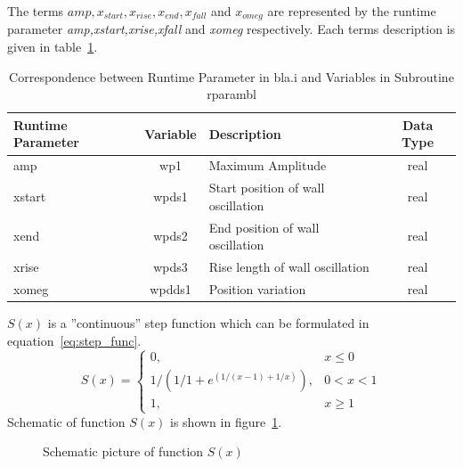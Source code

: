 The terms $amp,x_{start},x_{rise},x_{end},x_{fall}$ and $x_{omeg}$ are represented by the runtime parameter \emph{amp,xstart,xrise,xfall} and \emph{xomeg} respectively. Each terms description is given in table~\ref{tab:runtime}.
\begin{table}[h]
  \centering
  \begin{tabular}{|l|c|l|c|}\hline
    Runtime Parameter & Variable & Description & Data Type \\ \hline
    amp & wp1 & Maximum Amplitude & real \\
    xstart  & wpds1 & Start position of wall oscillation & real \\
    xend & wpds2 & End position of wall oscillation & real \\
    xrise & wpds3 & Rise length of wall oscillation & real \\
    xomeg & wpdds1 & Position variation & real \\ \hline
  \end{tabular}
  \caption{Correspondence between Runtime Parameter in bla.i and Variables in Subroutine rparambl}
  \label{tab:runtime}
\end{table}

$S(x)$ is a ''continuous'' step function which can be formulated in equation~\ref{eq:step_func}.
\begin{equation} \label{eq:step_func}
  S(x) = \left\{ 
    \begin{array}{lr}
      0, & x \leq 0 \\
      1/\left(1/1+e^{(1/(x-1)+1/x)}\right), & 0 < x < 1 \\
      1, & x \geq 1
    \end{array}
  \right.
\end{equation}
Schematic of function $S(x)$ is shown in figure~\ref{fig:step_func}.
\begin{figure}[h]
  \centering
  \caption{Schematic picture of function $S(x)$}
  \label{fig:step_func}
\end{figure}

